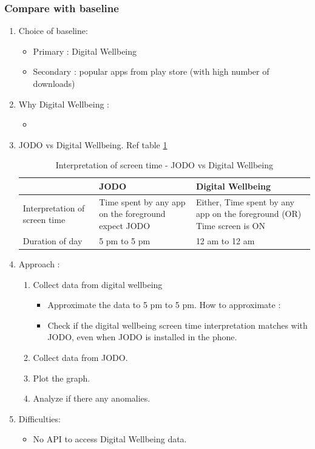 \documentclass{article}
\begin{document}
\subsubsection{Compare with baseline}
\begin{enumerate}
    \item Choice of baseline: 
    \begin{itemize}
        \item Primary : Digital Wellbeing
        \item Secondary : popular apps from play store (with high number of downloads)
    \end{itemize}
    \item Why Digital Wellbeing : 
    \begin{itemize}
        \item 
    \end{itemize}
    \item JODO vs Digital Wellbeing. Ref table \ref{tab:Interpretation_of_screen_time_-_JODO_vs_Digital_Wellbeing}

    \begin{table}
        \centering
        \begin{tabularx}{\textwidth}{l X X}\hline
             &  JODO & Digital Wellbeing\\\hline
             Interpretation of screen time&  Time spent by any app on the foreground expect JODO & Either,
Time spent by any app on the foreground 
(OR)
Time screen is ON\\\hline
             Duration of day&  5 pm to 5 pm & 12 am to 12 am\\ \hline
        \end{tabularx}
        \caption{Interpretation of screen time - JODO vs Digital Wellbeing}
        \label{tab:Interpretation_of_screen_time_-_JODO_vs_Digital_Wellbeing}
    \end{table}

    \item Approach : 
    \begin{enumerate}
        \item Collect data from digital wellbeing
        \begin{itemize}
            \item Approximate the data to 5 pm to 5 pm. How to approximate : 
            \item Check if the digital wellbeing screen time interpretation matches with JODO, even when JODO is installed in the phone.
        \end{itemize}
        \item Collect data from JODO.
        \item Plot the graph.
        \item Analyze if there any anomalies.
    \end{enumerate}

    \item Difficulties:
    \begin{itemize}
        \item No API to access Digital Wellbeing data.
    \end{itemize}
    
\end{enumerate}
\end{document}
